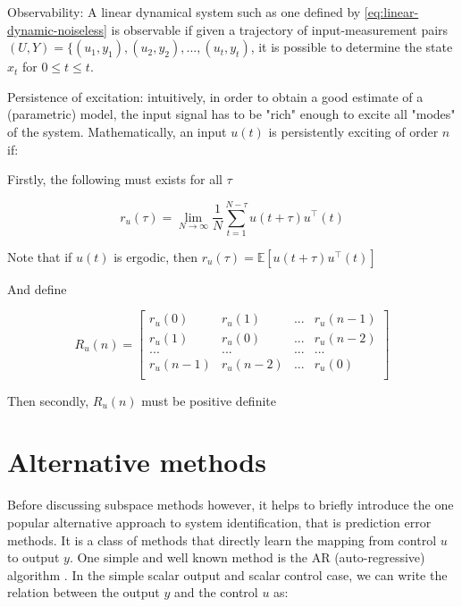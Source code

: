 \documentclass{article}[12pt]
\def\E{\mathbb{E}}
\def \E{\mathbb E}
\begin{document}
\begin{definition} Observability: A linear dynamical system such as one defined by \eqref{eq:linear-dynamic-noiseless} is observable if given a trajectory of input-measurement pairs $(U, Y) = \{(u_1, y_1), (u_2, y_2), ..., (u_t, y_t)$, it is possible to determine the state $x_t$ for $0 \leq t \leq t$.
\end{definition}

\begin{definition} Persistence of excitation: intuitively, in order to obtain a good estimate of a (parametric) model, the input signal has to be "rich" enough to excite all "modes" of the system. Mathematically, an input $u(t)$ is persistently exciting of order $n$ if:

Firstly, the following must exists for all $\tau$

$$r_u(\tau) = \lim_{N\rightarrow \infty}\frac{1}{N} \sum_{t=1}^{N-\tau} u(t+\tau)u^\top(t)$$

Note that if $u(t)$ is ergodic, then $r_u(\tau) = \E [u(t+\tau)u^\top(t)]$

And define 

$$R_u(n) = \begin{bmatrix}
r_u(0) &r_u(1) &... &r_u(n-1)\\
r_u(1) &r_u(0) &... &r_u(n-2)\\
... &... &... &...\\
r_u(n-1) &r_u(n-2) &... &r_u(0)\\
\end{bmatrix}$$

Then secondly, $R_u(n)$ must be positive definite

\end{definition}

\section{Alternative methods}

Before discussing subspace methods however, it helps to briefly introduce the one popular alternative approach to system identification, that is prediction error methods. It is a class of methods that directly learn the mapping from control $u$ to output $y$. One simple and well known method is the AR (auto-regressive) algorithm \cite{Ljung:system-identification-theory-for-the-user}. In the simple scalar output and scalar control case, we can write the relation between the output $y$ and the control $u$ as: 
\end{document}
